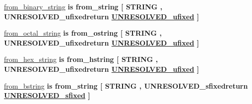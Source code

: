 \begin{DoxyCompactItemize}
\item 
\hyperlink{classfixed__pkg_aafa4d3f9d3a16fe18448d65ee36e70c7}{from\+\_\+binary\+\_\+string}  {\bfseries {\bfseries \textcolor{keywordflow}{is}\textcolor{vhdlchar}{ }\textcolor{vhdlchar}{from\+\_\+string}\textcolor{vhdlchar}{ }\textcolor{vhdlchar}{\mbox{[}}\textcolor{vhdlchar}{ }\textcolor{comment}{S\+T\+R\+I\+N\+G}\textcolor{vhdlchar}{ }\textcolor{vhdlchar}{,}\textcolor{vhdlchar}{ }\textcolor{vhdlchar}{U\+N\+R\+E\+S\+O\+L\+V\+E\+D\+\_\+ufixedreturn}\textcolor{vhdlchar}{ }{\bfseries \hyperlink{classfixed__pkg_ae78bc2b36d22f6abeac163955e8a587d}{U\+N\+R\+E\+S\+O\+L\+V\+E\+D\+\_\+ufixed}} \textcolor{vhdlchar}{ }\textcolor{vhdlchar}{\mbox{]}}\textcolor{vhdlchar}{ }}} {\bfseries \textcolor{vhdlchar}{ }} 
\item 
\hyperlink{classfixed__pkg_ae8e9e937706e3de2328aaadf3a10856b}{from\+\_\+octal\+\_\+string}  {\bfseries {\bfseries \textcolor{keywordflow}{is}\textcolor{vhdlchar}{ }\textcolor{vhdlchar}{from\+\_\+ostring}\textcolor{vhdlchar}{ }\textcolor{vhdlchar}{\mbox{[}}\textcolor{vhdlchar}{ }\textcolor{comment}{S\+T\+R\+I\+N\+G}\textcolor{vhdlchar}{ }\textcolor{vhdlchar}{,}\textcolor{vhdlchar}{ }\textcolor{vhdlchar}{U\+N\+R\+E\+S\+O\+L\+V\+E\+D\+\_\+ufixedreturn}\textcolor{vhdlchar}{ }{\bfseries \hyperlink{classfixed__pkg_ae78bc2b36d22f6abeac163955e8a587d}{U\+N\+R\+E\+S\+O\+L\+V\+E\+D\+\_\+ufixed}} \textcolor{vhdlchar}{ }\textcolor{vhdlchar}{\mbox{]}}\textcolor{vhdlchar}{ }}} {\bfseries \textcolor{vhdlchar}{ }} 
\item 
\hyperlink{classfixed__pkg_a724add031b8c0ffca95ef99b617b552c}{from\+\_\+hex\+\_\+string}  {\bfseries {\bfseries \textcolor{keywordflow}{is}\textcolor{vhdlchar}{ }\textcolor{vhdlchar}{from\+\_\+hstring}\textcolor{vhdlchar}{ }\textcolor{vhdlchar}{\mbox{[}}\textcolor{vhdlchar}{ }\textcolor{comment}{S\+T\+R\+I\+N\+G}\textcolor{vhdlchar}{ }\textcolor{vhdlchar}{,}\textcolor{vhdlchar}{ }\textcolor{vhdlchar}{U\+N\+R\+E\+S\+O\+L\+V\+E\+D\+\_\+ufixedreturn}\textcolor{vhdlchar}{ }{\bfseries \hyperlink{classfixed__pkg_ae78bc2b36d22f6abeac163955e8a587d}{U\+N\+R\+E\+S\+O\+L\+V\+E\+D\+\_\+ufixed}} \textcolor{vhdlchar}{ }\textcolor{vhdlchar}{\mbox{]}}\textcolor{vhdlchar}{ }}} {\bfseries \textcolor{vhdlchar}{ }} 
\item 
\hyperlink{classfixed__pkg_a6b28cd3c63eda48c2c2f1bb7fba726fc}{from\+\_\+bstring}  {\bfseries {\bfseries \textcolor{keywordflow}{is}\textcolor{vhdlchar}{ }\textcolor{vhdlchar}{from\+\_\+string}\textcolor{vhdlchar}{ }\textcolor{vhdlchar}{\mbox{[}}\textcolor{vhdlchar}{ }\textcolor{comment}{S\+T\+R\+I\+N\+G}\textcolor{vhdlchar}{ }\textcolor{vhdlchar}{,}\textcolor{vhdlchar}{ }\textcolor{vhdlchar}{U\+N\+R\+E\+S\+O\+L\+V\+E\+D\+\_\+sfixedreturn}\textcolor{vhdlchar}{ }{\bfseries \hyperlink{classfixed__pkg_aa723b28a027c3c0f9bca02d75e8df4d6}{U\+N\+R\+E\+S\+O\+L\+V\+E\+D\+\_\+sfixed}} \textcolor{vhdlchar}{ }\textcolor{vhdlchar}{\mbox{]}}\textcolor{vhdlchar}{ }}} {\bfseries \textcolor{vhdlchar}{ }} 

\end{DoxyCompactItemize}
